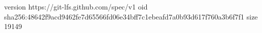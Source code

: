 version https://git-lfs.github.com/spec/v1
oid sha256:48642f9acd9462fe7d65566fd06e34bff7c1ebeafd7a0b93d617f760a3b6f7f1
size 19149
